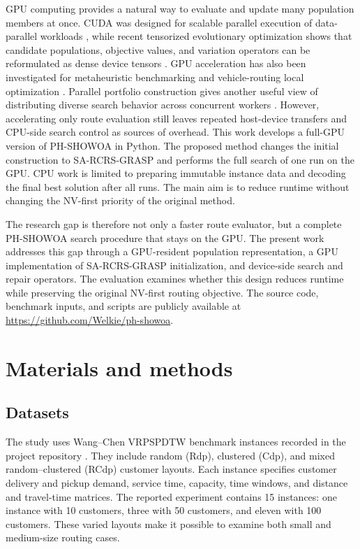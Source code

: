 \documentclass[pdflatex,sn-mathphys-num]{sn-jnl}
\begin{document}
GPU computing provides a natural way to evaluate and update many population members at once. CUDA was designed for scalable parallel execution of data-parallel workloads \cite{nickolls2008cuda}, while recent tensorized evolutionary optimization shows that candidate populations, objective values, and variation operators can be reformulated as dense device tensors \cite{liang2026tensorization}. GPU acceleration has also been investigated for metaheuristic benchmarking and vehicle-routing local optimization \cite{dorneles2023gpu,lin2025tensorvrp}. Parallel portfolio construction gives another useful view of distributing diverse search behavior across concurrent workers \cite{tang2021portfolio}. However, accelerating only route evaluation still leaves repeated host-device transfers and CPU-side search control as sources of overhead. This work develops a full-GPU version of PH-SHOWOA in Python. The proposed method changes the initial construction to SA-RCRS-GRASP and performs the full search of one run on the GPU. CPU work is limited to preparing immutable instance data and decoding the final best solution after all runs. The main aim is to reduce runtime without changing the NV-first priority of the original method.

The research gap is therefore not only a faster route evaluator, but a complete PH-SHOWOA search procedure that stays on the GPU. The present work addresses this gap through a GPU-resident population representation, a GPU implementation of SA-RCRS-GRASP initialization, and device-side search and repair operators. The evaluation examines whether this design reduces runtime while preserving the original NV-first routing objective. The source code, benchmark inputs, and scripts are publicly available at \url{https://github.com/Welkie/ph-showoa}.

\section{Materials and methods}\label{sec:methods}

\subsection{Datasets}\label{sec:datasets}

The study uses Wang--Chen VRPSPDTW benchmark instances recorded in the project repository \cite{wang2012ga}. They include random (Rdp), clustered (Cdp), and mixed random--clustered (RCdp) customer layouts. Each instance specifies customer delivery and pickup demand, service time, capacity, time windows, and distance and travel-time matrices. The reported experiment contains 15 instances: one instance with 10 customers, three with 50 customers, and eleven with 100 customers. These varied layouts make it possible to examine both small and medium-size routing cases.
\end{document}
